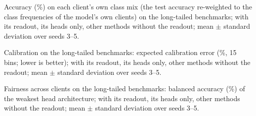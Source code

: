 
\begin{widetable}[t]
\centering\small
\caption{Accuracy (\%) on each client's own class mix (the test accuracy re-weighted to the class frequencies of the
model's own clients) on the long-tailed benchmarks; \ours with its readout, its heads only, other methods without
the readout; mean $\pm$ standard deviation over seeds 3--5.}
\label{tab:app-local}
\end{widetable}

\begin{widetable}[t]
\centering\small
\caption{Calibration on the long-tailed benchmarks: expected calibration error (\%, 15 bins; lower is better); \ours with its readout, its
heads only, other methods without the readout; mean $\pm$ standard deviation over seeds 3--5.}
\label{tab:app-calib}
\end{widetable}

\begin{widetable}[t]
\centering\small
\caption{Fairness across clients on the long-tailed benchmarks: balanced accuracy (\%) of the weakest head
architecture; \ours with its readout, its heads only, other methods without the readout; mean $\pm$ standard deviation over seeds 3--5.}
\label{tab:app-worstarch}
\end{widetable}
